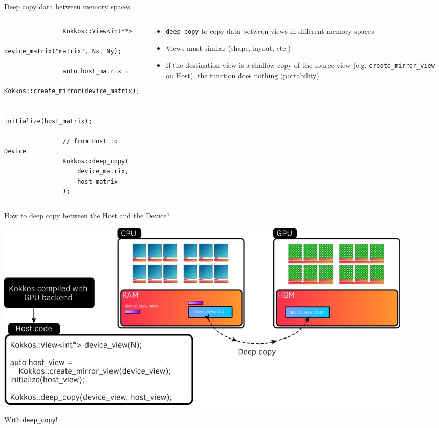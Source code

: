 \documentclass[
    aspectratio=169,
]{beamer}
\begin{document}
\begin{frame}[fragile]{Deep copy data between memory spaces}
    \begin{columns}
        \begin{column}{0.6\linewidth}
            \begin{verbatim}
                Kokkos::View<int**>
                    device_matrix("matrix", Nx, Ny);

                auto host_matrix =
                    Kokkos::create_mirror(device_matrix);

                initialize(host_matrix);

                // from Host to Device
                Kokkos::deep_copy(
                    device_matrix,
                    host_matrix
                );
            \end{verbatim}
        \end{column}
        \begin{column}{0.4\linewidth}
            \begin{itemize}
                \item \texttt{deep\_copy} to copy data between views in different memory spaces
                \item Views must similar (shape, layout, etc.)
                \item If the destination view is a shallow copy of the source view (e.g. \texttt{create\_mirror\_view} on Host), the function does nothing (portability)
            \end{itemize}
        \end{column}
    \end{columns}
\end{frame}


\begin{frame}{How to deep copy between the Host and the Device?}
    \begin{center}
        \includegraphics[width=0.9\textwidth]{host_device_deep_copy.png}
    \end{center}

     With \texttt{deep\_copy}!
\end{frame}
\end{document}
